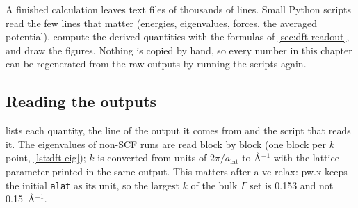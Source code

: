 \begin{dftplain}
A finished calculation leaves text files of thousands of lines. Small Python scripts read the few lines that matter
(energies, eigenvalues, forces, the averaged potential), compute the derived quantities with the formulas of
\cref{sec:dft-readout}, and draw the figures. Nothing is copied by hand, so every number in this chapter can be
regenerated from the raw outputs by running the scripts again.
\end{dftplain}

\subsection{Reading the outputs}
\label{sec:dft-parsing}

 lists each quantity, the line of the output it comes from and the script that reads it. The
eigenvalues of non-SCF runs are read block by block (one block per $k$ point, \cref{lst:dft-eig}); $k$ is converted from
units of $2\pi/a_{\mathrm{lat}}$ to \AA$^{-1}$ with the lattice parameter printed in the same output. This matters after
a vc-relax: pw.x keeps the initial \texttt{alat} as its unit, so the largest $k$ of the bulk $\Gamma$ set is 0.153 and
not 0.15~\AA$^{-1}$.

